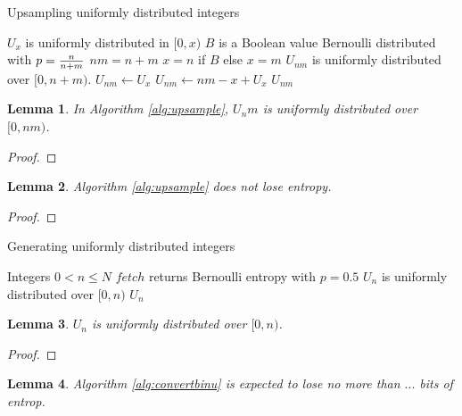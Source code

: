 \documentclass[12pt]{article}
\newtheorem{lemma}{Lemma}
\begin{document}
\begin{algorithm}
\caption{Upsampling uniformly distributed integers}
\label{alg:upsample}
\begin{algorithmic}[1]
\Require $U_x$ is uniformly distributed in $[0,x)$
\Require $B$ is a Boolean value Bernoulli distributed with $p={n\over n+m}$
\Require $nm = n+m$
\Require $x=n$ if $B$ else $x=m$
\Ensure $U_{nm}$ is uniformly distributed over $[0,n+m)$.
    \State $U_{nm} \gets U_x$  
  \Else
    \State $U_{nm} \gets nm-x+U_x$  
  \EndIf
  \State \Return $U_{nm}$
\EndProcedure
\end{algorithmic}
\end{algorithm}

\begin{lemma}
In Algorithm \ref{alg:upsample}, $U_nm$ is uniformly distributed over $[0,nm)$.
\end{lemma}

\begin{proof}
\end{proof}


\begin{lemma}
Algorithm \ref{alg:upsample} does not lose entropy.
\end{lemma}

\begin{proof}
\end{proof}

\begin{algorithm}
\caption{Generating uniformly distributed integers}
\label{alg:convertbinu}
\begin{algorithmic}[1]
\Require Integers $0 < n\le N$
\Require $fetch$ returns Bernoulli entropy with $p=0.5$
\Ensure $U_n$ is uniformly distributed over $[0,n)$
  \State \Return $U_{n}$
\EndProcedure
\end{algorithmic}
\end{algorithm}

\begin{lemma}
$U_n$ is uniformly distributed over $[0,n)$.
\end{lemma}

\begin{proof}
\end{proof}

\begin{lemma}
Algorithm \ref{alg:convertbinu} is expected to lose no more than $...$ bits of entrop.
\end{lemma}
\end{document}
